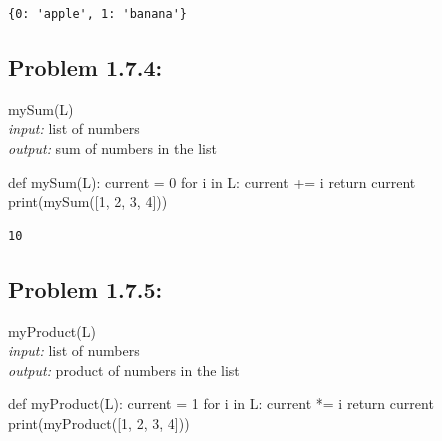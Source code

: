 \documentclass[
  letterpaper,
  DIV=11,
  numbers=noendperiod]{scrartcl}
\newenvironment{Shaded}{\begin{snugshade}}{\end{snugshade}}
\newcommand{\BuiltInTok}[1]{\textcolor[rgb]{0.00,0.23,0.31}{#1}}
\newcommand{\ControlFlowTok}[1]{\textcolor[rgb]{0.00,0.23,0.31}{#1}}
\newcommand{\DecValTok}[1]{\textcolor[rgb]{0.68,0.00,0.00}{#1}}
\newcommand{\KeywordTok}[1]{\textcolor[rgb]{0.00,0.23,0.31}{#1}}
\newcommand{\NormalTok}[1]{\textcolor[rgb]{0.00,0.23,0.31}{#1}}
\newcommand{\OperatorTok}[1]{\textcolor[rgb]{0.37,0.37,0.37}{#1}}
\begin{document}
\begin{verbatim}
{0: 'apple', 1: 'banana'}
\end{verbatim}

\hypertarget{problem-1.7.4}{%
\subsection{Problem 1.7.4:}\label{problem-1.7.4}}

mySum(L)\\
\emph{input:} list of numbers\\
\emph{output:} sum of numbers in the list

\begin{Shaded}
\begin{Highlighting}[numbers=left,,]
\KeywordTok{def}\NormalTok{ mySum(L): }
\NormalTok{    current }\OperatorTok{=} \DecValTok{0}
    \ControlFlowTok{for}\NormalTok{ i }\KeywordTok{in}\NormalTok{ L:}
\NormalTok{        current }\OperatorTok{+=}\NormalTok{ i}
    \ControlFlowTok{return}\NormalTok{ current}
\BuiltInTok{print}\NormalTok{(mySum([}\DecValTok{1}\NormalTok{, }\DecValTok{2}\NormalTok{, }\DecValTok{3}\NormalTok{, }\DecValTok{4}\NormalTok{]))}
\end{Highlighting}
\end{Shaded}

\begin{verbatim}
10
\end{verbatim}

\hypertarget{problem-1.7.5}{%
\subsection{Problem 1.7.5:}\label{problem-1.7.5}}

myProduct(L)\\
\emph{input:} list of numbers\\
\emph{output:} product of numbers in the list

\begin{Shaded}
\begin{Highlighting}[numbers=left,,]
\KeywordTok{def}\NormalTok{ myProduct(L): }
\NormalTok{    current }\OperatorTok{=} \DecValTok{1}
    \ControlFlowTok{for}\NormalTok{ i }\KeywordTok{in}\NormalTok{ L:}
\NormalTok{        current }\OperatorTok{*=}\NormalTok{ i}
    \ControlFlowTok{return}\NormalTok{ current}
\BuiltInTok{print}\NormalTok{(myProduct([}\DecValTok{1}\NormalTok{, }\DecValTok{2}\NormalTok{, }\DecValTok{3}\NormalTok{, }\DecValTok{4}\NormalTok{]))}
\end{Highlighting}
\end{Shaded}
\end{document}
